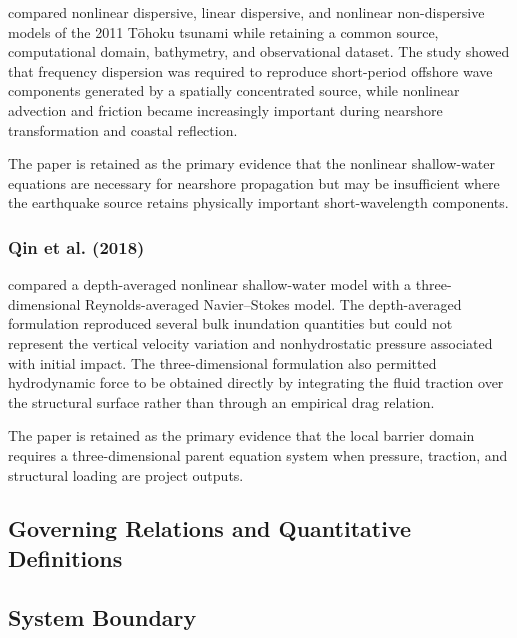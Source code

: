 \textcite{saito2014dispersion} compared nonlinear dispersive,
linear dispersive, and nonlinear non-dispersive models of the 2011
Tōhoku tsunami while retaining a common source, computational domain,
bathymetry, and observational dataset. The study showed that
frequency dispersion was required to reproduce short-period offshore
wave components generated by a spatially concentrated source, while
nonlinear advection and friction became increasingly important during
nearshore transformation and coastal reflection.

The paper is retained as the primary evidence that the nonlinear
shallow-water equations are necessary for nearshore propagation but
may be insufficient where the earthquake source retains physically
important short-wavelength components.

\subsubsection{Qin et al. (2018)}
\label{sec:res-mod-eqs-evidence-qin-2018}

\textcite{qin2018comparison} compared a depth-averaged nonlinear
shallow-water model with a three-dimensional Reynolds-averaged
Navier--Stokes model. The depth-averaged formulation reproduced several
bulk inundation quantities but could not represent the vertical
velocity variation and nonhydrostatic pressure associated with initial
impact. The three-dimensional formulation also permitted hydrodynamic
force to be obtained directly by integrating the fluid traction over
the structural surface rather than through an empirical drag relation.

The paper is retained as the primary evidence that the local barrier
domain requires a three-dimensional parent equation system when
pressure, traction, and structural loading are project outputs.

\subsection{Governing Relations and Quantitative Definitions}
\label{sec:res-mod-eqs-governing-relations}

%

\subsection{System Boundary}
\label{sec:res-mod-eqs-system-boundary}

